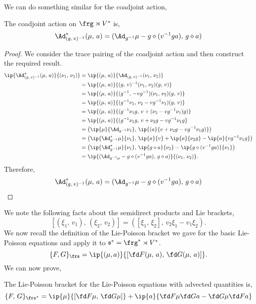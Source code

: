 \noindent
We can do something similar for the coadjoint action,
\begin{nprop}
   The coadjoint action on $\frg \rtimes V^*$ is,
   $$ \Ad^*_{(g,\, v)^{-1}} (\mu,\, a) = (\Ad_{g^{-1}}\mu - g \diamond (v^{-1}ga) ,\, g\diamond a) $$
\end{nprop}
\begin{proof}
  We consider the trace pairing of the coadjoint action and then construct the required result.
  \begin{align*}
    \ip{\Ad^*_{(g,\, v)^{-1}} (\mu,\, a)}{(\nu_1,\, \nu_2)} &= \ip{(\mu,\, a)}{\Ad_{(g,\,v)^{-1}} (\nu_1,\, \nu_2)} \\
    &= \ip{(\mu,\, a)}{(g,\,v)^{-1}(\nu_1,\, \nu_2)(g,\,v)} \\
    &= \ip{(\mu,\, a)}{ (g^{-1},\, -vg^{-1})(\nu_1,\, \nu_2)(g,\,v) } \\
    &= \ip{(\mu,\, a)}{(g^{-1}\nu_1,\, \nu_2 - vg^{-1}\nu_1)(g,\, v)} \\
    &= \ip{(\mu,\, a)}{(g^{-1}\nu_1 g,\,v + (\nu_2 - vg^{-1}\nu_1)g)} \\
    &= \ip{(\mu,\, a)}{(g^{-1}\nu_1 g,\,v + \nu_2g - vg^{-1}\nu_1g} \\
    &= \left(\ip{\mu}{\Ad_{g^{-1}}\nu_1},\, \ip{(a}{v + \nu_2g - vg^{-1}\nu_1g )}\right) \\
    &= \left( \ip{\Ad_{g^{-1}}^*\mu}{ \nu_1} ,\, \ip{a}{v} + \ip{a}{\nu_2g} - \ip{a}{vg^{-1}\nu_1g}\right) \\
    &= \left( \ip{\Ad_{g^{-1}}^*\mu}{ \nu_1} ,\, \ip{g \diamond a}{\nu_2} - \ip{g \diamond (v^{-1}ga)}{\nu_1}\right) \\
    &= \ip{(\Ad_{g^{-1}\mu} -g \diamond (v^{-1}ga),\, g \diamond a)}{(\nu_1,\, \nu_2)}.
  \end{align*}
  Therefore,
  $$ \Ad^*_{(g,\, v)^{-1}} (\mu,\, a) = (\Ad_{g^{-1}}\mu - g \diamond (v^{-1}ga) ,\, g\diamond a) $$
\end{proof}
\noindent
We note the following facts about the semidirect products and Lie brackets,
$$ [(\xi_1,\, v_1),\, (\xi_2,\,v_2)] = ([\xi_1,\,\xi_2],\, v_2\xi_1 - v_1\xi_2). $$
\noindent
We now recall the definition of the Lie-Poisson bracket we gave for the basic Lie-Poisson equations and apply it to $\mathfrak{s}^* = \frg^* \rtimes V^*$.
\begin{equation}
  \{F, G\}_{\frs} = \ip{(\mu, a)}{\left[ \fd F {(\mu,\, a)},\, \fd G {(\mu,\, a)} \right]}.\label{eq:lp_aq}
\end{equation}
We can now prove,
\begin{nlemma}
  The Lie-Poisson bracket for the Lie-Poisson equations with advected quantities is,
  $$ \{F,\, G\}_{\frs^*} = \ip{\mu}{\left[ \fd F \mu,\, \fd G \mu \right]} + \ip{a}{\fd F \mu \fd G a - \fd G \mu \fd F a} $$
\end{nlemma}
